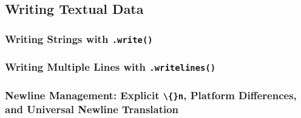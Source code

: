 \subsection{Writing Textual Data}
\subsubsection{Writing Strings with \texttt{.write()}}
\subsubsection{Writing Multiple Lines with \texttt{.writelines()}}
\subsubsection{Newline Management: Explicit \texttt{\textbackslash\{\}n}, Platform Differences, and Universal Newline Translation}
